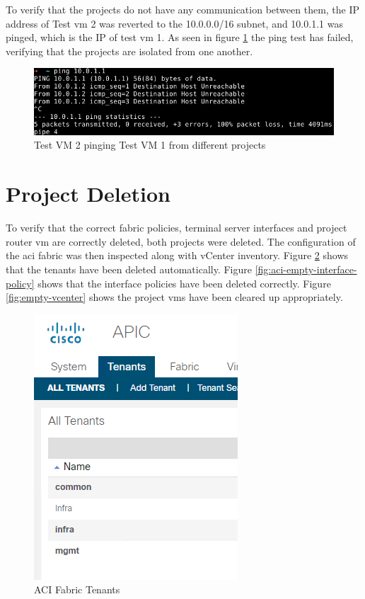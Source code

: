 To verify that the projects do not have any communication between them, the IP address of Test \gls{vm} 2 was reverted to the 10.0.0.0/16 subnet, and 10.0.1.1 was pinged, which is the IP of test \gls{vm} 1. As seen in figure \ref{fig:inter-project-communication} the ping test has failed, verifying that the projects are isolated from one another.

\begin{figure}[H]
    \centering
    \includegraphics[scale=1.2]{images/inter-project-communication.png}
    \caption{Test VM 2 pinging Test VM 1 from different projects}
    \label{fig:inter-project-communication}
\end{figure}

\section{Project Deletion}
To verify that the correct fabric policies, terminal server interfaces and project router \gls{vm} are correctly deleted, both projects were deleted. The configuration of the \gls{aci} fabric was then inspected along with vCenter inventory. Figure \ref{fig:aci-empty-tenants} shows that the tenants have been deleted automatically. Figure \ref{fig:aci-empty-interface-policy} shows that the interface policies have been deleted correctly. Figure \ref{fig:empty-vcenter} shows the project \gls{vm}s have been cleared up appropriately.


\begin{figure}[H]
    \centering
    \includegraphics[scale=1.2]{images/aci-empty-tenants.png}
    \caption{ACI Fabric Tenants}
    \label{fig:aci-empty-tenants}
\end{figure}

